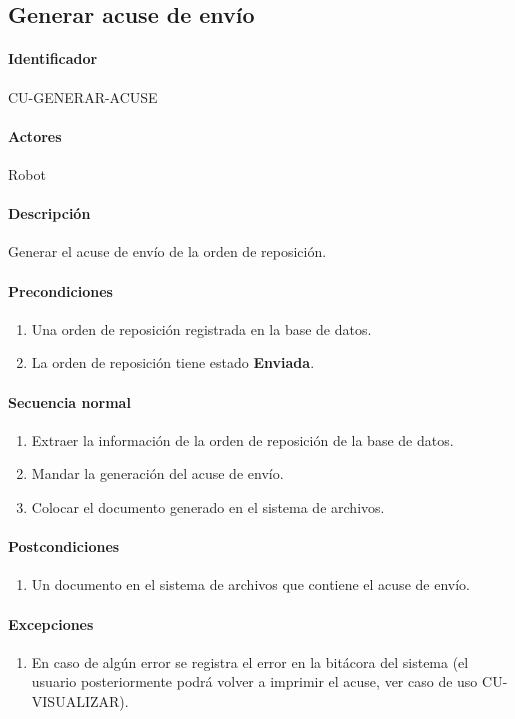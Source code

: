 \subsection{Generar acuse de envío}
\paragraph*{Identificador}
CU-GENERAR-ACUSE
\paragraph*{Actores}
Robot
\paragraph*{Descripción}
Generar el acuse de envío de la orden de reposición.
\paragraph*{Precondiciones}
\begin{enumerate}
  \item Una orden de reposición registrada en la base de datos.
  \item La orden de reposición tiene estado \textbf{Enviada}.
\end{enumerate}
\paragraph*{Secuencia normal}
\begin{enumerate}
  \item Extraer la información de la orden de reposición de la base de datos.
  \item Mandar la generación del acuse de envío.
  \item Colocar el documento generado en el sistema de archivos.
\end{enumerate}
\paragraph*{Postcondiciones}
\begin{enumerate}
  \item Un documento en el sistema de archivos que contiene el acuse de envío.
\end{enumerate}
\paragraph*{Excepciones}
\begin{enumerate}
  \item En caso de algún error se registra el error en la bitácora del sistema (el usuario posteriormente podrá volver a imprimir el acuse, ver caso de uso CU-VISUALIZAR).
\end{enumerate}


